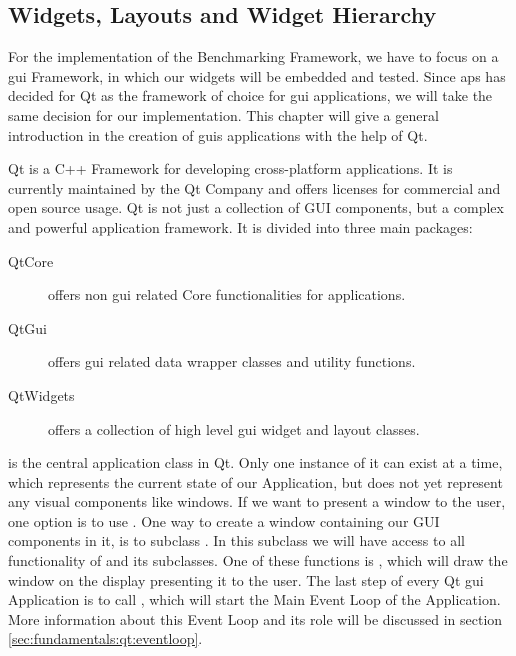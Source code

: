 
\subsection{Widgets, Layouts and Widget Hierarchy}
\label{sec:fundamentals:qt:basics}

For the implementation of the Benchmarking Framework, we have to focus on a
\gls{gui} Framework, in which our widgets will be embedded and tested. Since
\gls{aps} has decided for Qt as the framework of choice for \gls{gui}
applications, we will take the same decision for our implementation. This
chapter will give a general introduction in the creation of \glspl{gui}
applications with the help of Qt.

Qt is a C++ Framework for developing cross-platform applications. It is
currently maintained by the Qt Company and offers licenses for commercial and
open source usage. Qt is not just a collection of GUI components, but a complex
and powerful application framework. It is divided into three main packages:

\begin{description}
    
    \item[QtCore] offers non \gls{gui} related Core functionalities for
        applications.  

    \item[QtGui] offers \gls{gui} related data wrapper
        classes and utility functions.
    
    \item[QtWidgets] offers a collection of high level \gls{gui} widget and
        layout classes.  

\end{description}

 is the central application class in
Qt. Only one instance of it can exist at a time, which represents the current
state of our Application, but does not yet represent any visual components like
windows. If we want to present a window to the user, one option is to use
. One way to create a window
containing our GUI components in it, is to subclass
. In this subclass we will have access to all
functionality of  and its subclasses. One of
these functions is , which will
draw the window on the display presenting it to the user. The last step of every
Qt \gls{gui} Application is to call
, which will start the Main
Event Loop of the Application. More information about this Event Loop and its
role will be discussed in section \ref{sec:fundamentals:qt:eventloop}.

